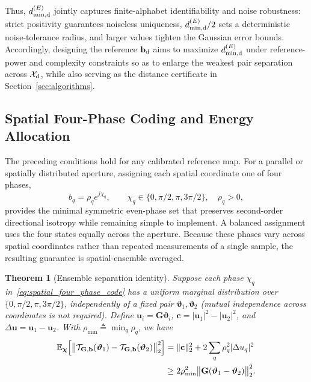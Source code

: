\documentclass[journal]{IEEEtran}
\newtheorem{theorem}{Theorem}
\begin{document}
Thus, $d_{\min,{\rm d}}^{(E)}$ jointly captures finite-alphabet identifiability and noise robustness: strict positivity guarantees noiseless uniqueness, $d_{\min,{\rm d}}^{(E)}/2$ sets a deterministic noise-tolerance radius, and larger values tighten the Gaussian error bounds. Accordingly, designing the reference $\mathbf{b}_{\rm d}$ aims to maximize $d_{\min,{\rm d}}^{(E)}$ under reference-power and complexity constraints so as to enlarge the weakest pair separation across $\mathcal{X}_{\rm d}$, while also serving as the distance certificate in Section~\ref{sec:algorithms}.

\subsection{Spatial Four-Phase Coding and Energy Allocation}

The preceding conditions hold for any calibrated reference map. For a parallel or spatially distributed aperture, assigning each spatial coordinate one of four phases,
\begin{equation}
b_q = \rho_q e^{j\chi_q}, \qquad
\chi_q \in \{0, \pi/2, \pi, 3\pi/2\}, \quad \rho_q > 0,
\label{eq:spatial_four_phase_code}
\end{equation}
provides the minimal symmetric even-phase set that preserves second-order directional isotropy while remaining simple to implement. A balanced assignment uses the four states equally across the aperture. Because these phases vary across spatial coordinates rather than repeated measurements of a single sample, the resulting guarantee is spatial-ensemble averaged.

\begin{theorem}[Ensemble separation identity]
\label{thm:spatial_four_phase_mean_separation}
Suppose each phase $\chi_q$ in~\eqref{eq:spatial_four_phase_code} has a uniform marginal distribution over $\{0, \pi/2, \pi, 3\pi/2\}$, independently of a fixed pair $\boldsymbol{\vartheta}_1, \boldsymbol{\vartheta}_2$ (mutual independence across coordinates is not required). Define $\mathbf{u}_i = \mathbf{G}\boldsymbol{\vartheta}_i$, $\mathbf{c} = |\mathbf{u}_1|^2 - |\mathbf{u}_2|^2$, and $\Delta\mathbf{u} = \mathbf{u}_1 - \mathbf{u}_2$. With $\rho_{\min} \triangleq \min_q \rho_q$, we have
\begin{equation}
\begin{aligned}
\mathbb{E}_{\boldsymbol{\chi}}
\Bigl[\bigl\|\mathcal{T}_{\mathbf{G},\mathbf{b}}(\boldsymbol{\vartheta}_1)
- \mathcal{T}_{\mathbf{G},\mathbf{b}}(\boldsymbol{\vartheta}_2)\bigr\|_{2}^{2}\Bigr]
&= \|\mathbf{c}\|_{2}^{2} + 2\sum_q \rho_q^{2}|\Delta u_q|^{2} \\
&\ge 2\rho_{\min}^{2}
\bigl\|\mathbf{G}(\boldsymbol{\vartheta}_1 - \boldsymbol{\vartheta}_2)\bigr\|_{2}^{2}.
\end{aligned}
\label{eq:spatial_four_phase_mean_distance}
\end{equation}
\end{theorem}
\end{document}
